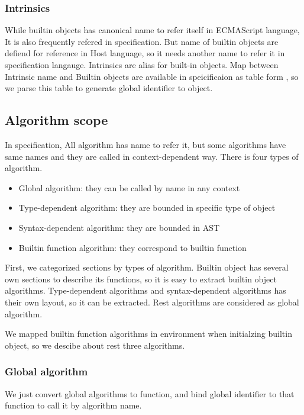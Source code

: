  \subsubsection{Intrinsics}

 While builtin objects has canonical name to refer itself in ECMAScript language, It is also frequently refered in specification. But name of builtin objects
 are defiend for reference in Host language, so it needs another name to refer it in specification langauge. Intrinsics are alias for built-in objects. 
 Map between Intrinsic name and Builtin objects are available in speicificaion as table form , so we parse this table to generate global identifier to object.

\subsection{Algorithm scope}

 In specification, All algorithm has name to refer it, but some algorithms have same names and they are called in context-dependent way.
 There is four types of algorithm. 
 \begin{itemize}
  \item Global algorithm: they can be called by name in any context
  \item Type-dependent algorithm: they are bounded in specific type of object
  \item Syntax-dependent algorithm: they are bounded in AST
  \item Builtin function algorithm: they correspond to builtin function
  \end{itemize}

  First, we categorized sections by types of algorithm. Builtin object has several own sections to describe its functions,
so it is easy to extract builtin object algorithms. Type-dependent algorithms and syntax-dependent algorithms has their own layout, so it
can be extracted. Rest algorithms are considered as global algorithm.

We mapped builtin function algorithms in environment when initialzing builtin object, so we descibe about rest three algorithms. 

\subsubsection{Global algorithm}

We just convert global algorithms to function, and bind global identifier to that function to call it by algorithm name.

